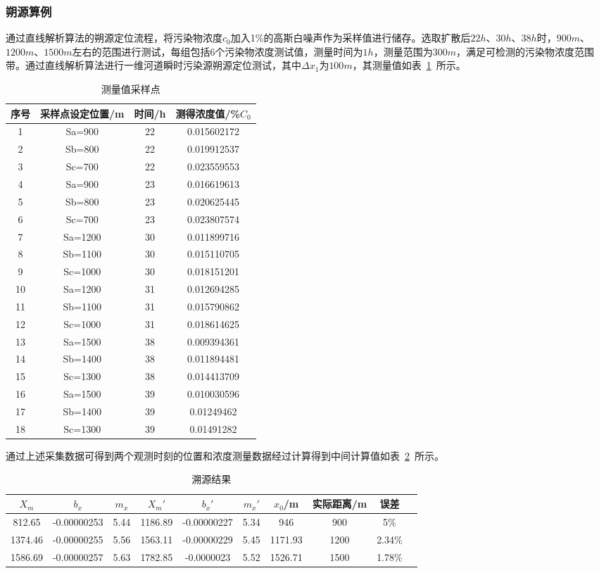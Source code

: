 \documentclass{whutmod}
\begin{document}
\subsubsection{朔源算例}

通过直线解析算法的朔源定位流程，将污染物浓度$c_{0}$加入1\%的高斯白噪声作为采样值进行储存。选取扩散后$22h$、$30h$、$38h$时，$900m$、$1200m$、$1500m$左右的范围进行测试，每组包括6个污染物浓度测试值，测量时间为$1h$，测量范围为$300m$，满足可检测的污染物浓度范围带。通过直线解析算法进行一维河道瞬时污染源朔源定位测试，其中$\Delta x_{1}$为$100m$，其测量值如表~\ref{biao}~所示。
	\begin{table}[H]
	\caption{测量值采样点}\label{biao} \centering
	\begin{tabular}{cccc}
		\toprule[1.5pt]
		序号 &采样点设定位置/m&  时间/h & 测得浓度值/\%$C_{0}$ \\
		\midrule[1pt]
		1	& Sa=900 &22 &0.015602172\\
		2	& Sb=800 & 22 &0.019912537\\
		3	& Sc=700 &22 &0.023559553\\
		4	& Sa=900 &23 &0.016619613\\
		5	& Sb=800 &23 &0.020625445\\
		6	& Sc=700 &23&0.023807574\\
		7	& Sa=1200 &30 &0.011899716\\
		8	& Sb=1100 &30 &0.015110705\\
		9	& Sc=1000 &30 &0.018151201\\
		10	& Sa=1200 &31 &0.012694285\\
		11	& Sb=1100 &31 &0.015790862\\
		12	& Sc=1000 &31 &0.018614625\\
		13	& Sa=1500 &38 &0.009394361\\
		14	& Sb=1400 &38 &0.011894481\\
		15	& Sc=1300 &38 &0.014413709\\
		16	& Sa=1500 &39 &0.010030596\\
		17	& Sb=1400 &39 &0.01249462\\
		18	& Sc=1300 &39 &0.01491282\\
		\bottomrule[1.5pt]
	\end{tabular}
\end{table}

通过上述采集数据可得到两个观测时刻的位置和浓度测量数据经过计算得到中间计算值如表~\ref{biao2}~所示。
	\begin{table}[H]
	\caption{溯源结果}\label{biao2} \centering
	\begin{tabular}{cccccccccc}
		\toprule[1.5pt]
		$X_{m}$& $b_{x}$ & $m_{x}$ &${X_{m}}'$ & ${b_{x}}'$&${m_{x}}'$&$x_{0}$/m&实际距离/m& 误差\\
		\midrule[1pt]
		812.65 &-0.00000253 &5.44&1186.89&-0.00000227&5.34&946&900&5\%\\
		1374.46& -0.00000255 &5.56&1563.11&-0.00000229&5.45&1171.93&1200&2.34\%\\
		1586.69 &-0.00000257 &5.63&1782.85&-0.0000023&5.52&1526.71&1500&1.78\%\\
		\bottomrule[1.5pt]
	\end{tabular}
\end{table}
\end{document}
